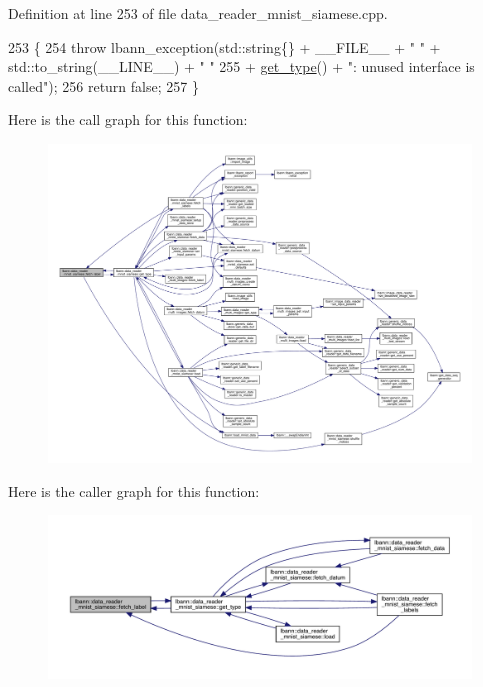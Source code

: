 Definition at line 253 of file data\+\_\+reader\+\_\+mnist\+\_\+siamese.\+cpp.


\begin{DoxyCode}
253                                                                                     \{
254   \textcolor{keywordflow}{throw} lbann\_exception(std::string\{\} + \_\_FILE\_\_ + \textcolor{stringliteral}{" "} + std::to\_string(\_\_LINE\_\_) + \textcolor{stringliteral}{" "}
255                         + \hyperlink{classlbann_1_1data__reader__mnist__siamese_a2c5a29603f850bb0684dba1c64981604}{get\_type}() + \textcolor{stringliteral}{": unused interface is called"});
256   \textcolor{keywordflow}{return} \textcolor{keyword}{false};
257 \}
\end{DoxyCode}
Here is the call graph for this function\+:\nopagebreak
\begin{figure}[H]
\begin{center}
\leavevmode
\includegraphics[width=350pt]{classlbann_1_1data__reader__mnist__siamese_a0f4171af4c56100c1c78cb53e938222c_cgraph}
\end{center}
\end{figure}
Here is the caller graph for this function\+:\nopagebreak
\begin{figure}[H]
\begin{center}
\leavevmode
\includegraphics[width=350pt]{classlbann_1_1data__reader__mnist__siamese_a0f4171af4c56100c1c78cb53e938222c_icgraph}
\end{center}
\end{figure}

